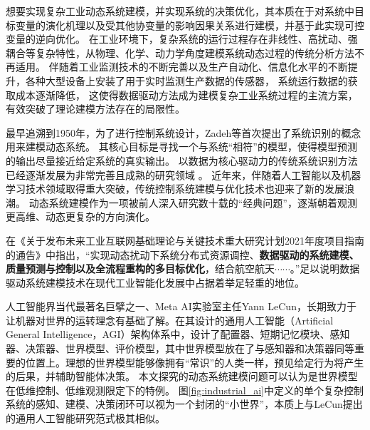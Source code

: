 想要实现复杂工业动态系统建模，并实现系统的决策优化，其本质在于对系统中目标变量的演化机理以及受其他协变量的影响因果关系进行建模，并基于此实现可控变量的逆向优化。
在工业环境下，复杂系统的运行过程存在非线性、高扰动、强耦合等复杂特性，从物理、化学、动力学角度建模系统动态过程的传统分析方法不再适用。
伴随着工业监测技术的不断完善以及生产自动化、信息化水平的不断提升，各种大型设备上安装了用于实时监测生产数据的传感器，
系统运行数据的获取成本逐渐降低，
这使得数据驱动方法成为建模复杂工业系统过程的主流方案，有效突破了理论建模方法存在的局限性。

最早追溯到1950年，为了进行控制系统设计，Zadeh等\cite{zadeh1956identification}首次提出了系统识别的概念用来建模动态系统。
其核心目标是寻找一个与系统“相符”的模型，使得模型预测的输出尽量接近给定系统的真实输出。
以数据为核心驱动力的传统系统识别方法已经逐渐发展为非常完善且成熟的研究领域
\cite{le2013system,gevers2006personal,ljung2008perspectives,ljung2011four,Ljung2020}。
近年来，伴随着人工智能以及机器学习技术领域取得重大突破，传统控制系统建模与优化技术也迎来了新的发展浪潮。
动态系统建模作为一项被前人深入研究数十载的“经典问题”，逐渐朝着观测更高维、动态更复杂的方向演化。

在《关于发布未来工业互联网基础理论与关键技术重大研究计划2021年度项目指南的通告》中指出，“实现动态扰动下系统分布式资源调控、\textbf{数据驱动的系统建模、质量预测与控制以及全流程重构的多目标优化}，结合航空航天$\cdots\cdots$。”足以说明数据驱动系统建模技术在现代工业智能化发展中占据着举足轻重的地位。

人工智能界当代最著名巨擘之一、Meta AI实验室主任Yann LeCun，长期致力于让机器对世界的运转理念有基础了解。在其设计的通用人工智能（Artificial General Intelligence，AGI）架构体系中，设计了配置器、短期记忆模块、感知器、决策器、世界模型、评价模型，其中世界模型放在了与感知器和决策器同等重要的位置上。理想的世界模型能够像拥有“常识”的人类一样，预见给定行为将产生的后果，并辅助智能体决策。
本文探究的动态系统建模问题可以认为是世界模型在低维控制、低维观测限定下的特例。
图\ref{fig:industrial_ai}中定义的单个复杂控制系统的感知、建模、决策闭环可以视为一个封闭的“小世界”，本质上与LeCun提出的通用人工智能研究范式极其相似。


